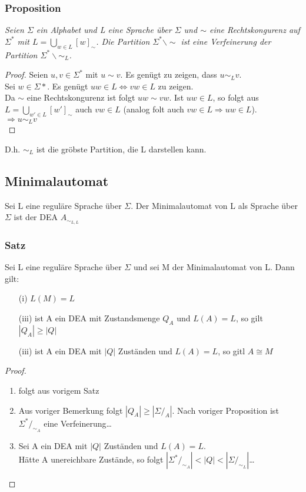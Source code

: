     \subsubsection*{Proposition}
        \textit{Seien \(\Sigma\) ein Alphabet und L eine Sprache über \(\Sigma\) und \(\sim\) eine Rechtskongurenz auf \(\Sigma^*\) mit \(L=\bigcup_{w\in L}[w]_\sim\). Die Partition \(\Sigma^*\backslash\sim\) ist eine Verfeinerung der Partition \(\Sigma^*\backslash\sim_L\).}\par\bigskip
    \begin{proof}
        Seien \(u,v\in\Sigma^*\) mit \(u\sim v\). Es genügt zu zeigen, dass \(u\sim_Lv\).\\
        Sei \(w\in\Sigma*\). Es genügt \(uw\in L\Leftrightarrow vw\in L\) zu zeigen.\\
        Da \(\sim\) eine Rechtskongurenz ist folgt \(uw\sim vw\). Ist \(uw\in L\), so folgt aus \(L=\bigcup_{w'\in L}[w']_\sim\) auch \(vw\in L\) (analog folt auch \(vw\in L\Rightarrow uw\in L\)).\\
        \(\Rightarrow u\sim_Lv\)\\
    \end{proof}
        D.h. \(\sim_L\) ist die gröbste Partition, die L darstellen kann.
\subsection{Minimalautomat}
    Sei L eine reguläre Sprache über \(\Sigma\). Der Minimalautomat von L als Sprache über \(\Sigma\) ist der DEA \(A_{\sim_{L,L}}\)
    \subsubsection*{Satz}
        Sei L eine reguläre Sprache über \(\Sigma\) und sei M der Minimalautomat von L. Dann gilt:
        \begin{enumerate}
            \item[(i)]\(L(M)=L\)
            \item[(iii)]ist A ein DEA mit Zustandsmenge \(Q_A\) und \(L(A)=L\), so gilt \(|Q_A|\geq|Q|\)
            \item[(iii)]ist A ein DEA mit \(|Q|\) Zuständen und \(L(A)=L\), so gitl \(A\cong M\) 
        \end{enumerate}
        \begin{proof}
            \begin{enumerate}[label=(\roman*)]
                \item folgt aus vorigem Satz 
                \item Aus voriger Bemerkung folgt \(|Q_A|\geq|\Sigma/_A|\). Nach voriger Proposition ist \(\Sigma^*/_{\sim_A}\) eine Verfeinerung\dots
                \item Sei A ein DEA mit \(|Q|\) Zuständen und \(L(A)=L\).\\
                Hätte A unereichbare Zustände, so folgt \(|\Sigma^*/_{\sim_A}|<|Q|<|\Sigma/_{\sim_L}|\)\dots
            \end{enumerate}
        \end{proof}
